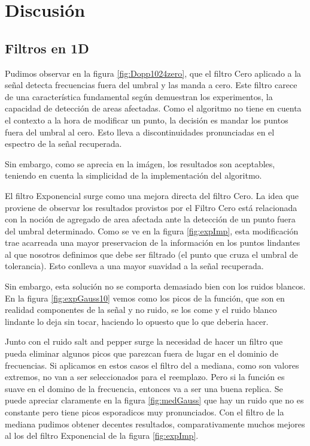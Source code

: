 \section{Discusi\'on}

\subsection{Filtros en 1D}

Pudimos observar en la figura \ref{fig:Dopp1024zero}, que el filtro Cero
aplicado a la se\~nal detecta frecuencias fuera del umbral y
las manda a cero. Este filtro carece de una caracter\'istica fundamental
seg\'un demuestran los experimentos, la capacidad de detecci\'on de areas afectadas. 
Como el algoritmo no tiene en cuenta el contexto a la hora de modificar un punto, la decisi\'on es mandar los
puntos fuera del umbral al cero. Esto lleva a discontinuidades pronunciadas en
el espectro de la se\~nal recuperada.

Sin embargo, como se aprecia en la im\'agen, los resultados son aceptables, 
teniendo en cuenta la simplicidad de la implementaci\'on del algoritmo.

El filtro Exponencial surge como una mejora directa del filtro Cero.
La idea que proviene de observar los resultados provistos por el Filtro Cero est\'a relacionada con la
noci\'on de agregado de area afectada ante la detecci\'on de un punto fuera
del umbral determinado. Como se ve en la figura \ref{fig:expImp}, esta modificaci\'on trae
acarreada una mayor preservacion de la informaci\'on en los puntos lindantes al que nosotros
definimos que debe ser filtrado (el punto que cruza el umbral de tolerancia). Esto conlleva 
a una mayor suavidad a la se\~nal recuperada.

Sin embargo, esta soluci\'on no se comporta demasiado bien con los ruidos blancos.
En la figura \ref{fig:expGauss10} vemos como los picos de la funci\'on, que son en realidad
componentes de la se\~nal y no ruido, se los come y el ruido blanco lindante lo deja
sin tocar, haciendo lo opuesto que lo que deberia hacer.

Junto con el ruido salt and pepper surge la necesidad de hacer un filtro que pueda eliminar
algunos picos que parezcan fuera de lugar en el dominio de frecuencias.  Si aplicamos en estos casos
el filtro del a mediana, como son valores extremos, no van a ser seleccionados para el reemplazo.
Pero si la funci\'on es suave en el domino de la frecuencia, entonces va a ser una buena replica.
Se puede apreciar claramente en la figura \ref{fig:medGauss} que hay un ruido que no es constante pero tiene
picos esporadicos muy pronunciados. Con el filtro de la mediana pudimos obtener decentes resultados,
comparativamente muchos mejores al los del filtro Exponencial de la figura \ref{fig:expImp}.


